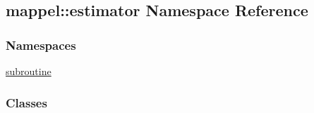 \hypertarget{namespacemappel_1_1estimator}{}\subsection{mappel\+:\+:estimator Namespace Reference}
\label{namespacemappel_1_1estimator}
\subsubsection*{Namespaces}
\begin{DoxyCompactItemize}
\item 
 \hyperlink{namespacemappel_1_1estimator_1_1subroutine}{subroutine}
\end{DoxyCompactItemize}
\subsubsection*{Classes}

